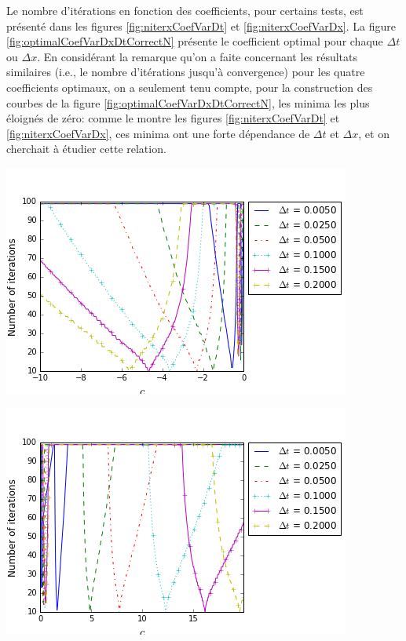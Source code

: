 \indent Le nombre d'itérations en fonction des coefficients, pour certains tests, est présenté dans les figures \ref{fig:niterxCoefVarDt} et \ref{fig:niterxCoefVarDx}. La figure \ref{fig:optimalCoefVarDxDtCorrectN} présente le coefficient optimal pour chaque $\Delta t$ ou $\Delta x$. En considérant la remarque qu'on a faite concernant les résultats similaires (i.e., le nombre d'itérations jusqu'à convergence) pour les quatre coefficients optimaux, on a seulement tenu compte, pour la construction des courbes de la figure \ref{fig:optimalCoefVarDxDtCorrectN}, les minima les plus éloignés de zéro: comme le montre les figures \ref{fig:niterxCoefVarDt} et \ref{fig:niterxCoefVarDx}, ces minima ont une forte dépendance de $\Delta t$ et $\Delta x$, et on cherchait à étudier cette relation.

\begingroup
\noindent
\begin{minipage}{.45\linewidth}
	\includegraphics[scale=.45]{figures/FinalFigures/NiterxCoefVarDtdx250FinalVersionNMarshal.png}
\end{minipage}
\hfill
\begin{minipage}{.45\linewidth}
	\includegraphics[scale=.45]{figures/FinalFigures/NiterxCoefVarDtdx250FinalVersionPMarshal.png}
\end{minipage}
\endgroup

